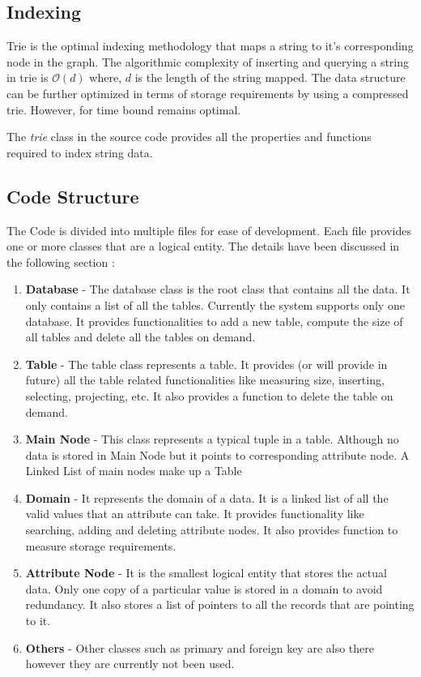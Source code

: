 \documentclass[12pt, oneside]{book}
\begin{document}
\subsection{Indexing}
Trie is the optimal indexing methodology that maps a string to it's corresponding node in the graph. The algorithmic complexity of inserting and querying a string in trie is $\mathcal{O} \left( d\right)$ where, $d$ is the length of the string mapped. The data structure can be further optimized in terms of storage requirements by using a compressed trie. However, for time bound remains optimal.
\par
The \emph{trie} class in the source code provides all the properties and functions required to index string data.
\subsection{Code Structure}
The Code is divided into multiple files for ease of development. Each file provides one or more classes that are a logical entity. The details have been discussed in the following section :
\begin{enumerate}
 \item \textbf{Database} - The database class is the root class that contains all the data. It only contains a list of all the tables. Currently the system supports only one database. It provides functionalities to add a new table, compute the size of all tables and delete all the tables on demand.
 \item \textbf{Table} - The table class represents a table. It provides (or will provide in future) all the table related functionalities like measuring size, inserting, selecting, projecting, etc. It also provides a function to delete the table on demand.
 \item \textbf{Main Node} - This class represents a typical tuple in a table. Although no data is stored in Main Node but it points to corresponding attribute node. A Linked List of main nodes make up a Table
 \item \textbf{Domain} - It represents the domain of a data. It is a linked list of all the valid values that an attribute can take. It provides functionality like searching, adding and deleting attribute nodes. It also provides function to measure storage requirements.
 \item \textbf{Attribute Node} - It is the smallest logical entity that stores the actual data. Only one copy of a particular value is stored in a domain to avoid redundancy. It also stores a list of pointers to all the records that are pointing to it.
 \item \textbf{Others} - Other classes such as primary and foreign key are also there however they are currently not been used.
\end{enumerate}
\end{document}
